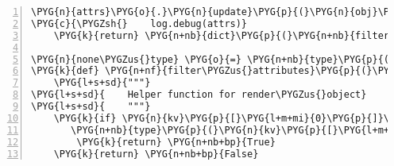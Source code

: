 \begin{Verbatim}[commandchars=\\\{\},numbers=left,firstnumber=1,stepnumber=5]
    \PYG{n}{attrs}\PYG{o}{.}\PYG{n}{update}\PYG{p}{(}\PYG{n}{obj}\PYG{o}{.}\PYG{n}{\PYGZus{}\PYGZus{}dict\PYGZus{}\PYGZus{}}\PYG{p}{)}
\PYG{c}{\PYGZsh{}    log.debug(attrs)}
    \PYG{k}{return} \PYG{n+nb}{dict}\PYG{p}{(}\PYG{n+nb}{filter}\PYG{p}{(}\PYG{n}{filter\PYGZus{}attributes}\PYG{p}{,} \PYG{n}{attrs}\PYG{o}{.}\PYG{n}{iteritems}\PYG{p}{(}\PYG{p}{)}\PYG{p}{)}\PYG{p}{)}

\PYG{n}{none\PYGZus{}type} \PYG{o}{=} \PYG{n+nb}{type}\PYG{p}{(}\PYG{n+nb+bp}{None}\PYG{p}{)}
\PYG{k}{def} \PYG{n+nf}{filter\PYGZus{}attributes}\PYG{p}{(}\PYG{n}{kv}\PYG{p}{)}\PYG{p}{:}
    \PYG{l+s+sd}{"""}
\PYG{l+s+sd}{    Helper function for render\PYGZus{}object}
\PYG{l+s+sd}{    """}
    \PYG{k}{if} \PYG{n}{kv}\PYG{p}{[}\PYG{l+m+mi}{0}\PYG{p}{]}\PYG{p}{[}\PYG{l+m+mi}{0}\PYG{p}{]} \PYG{o}{!=} \PYG{l+s}{'}\PYG{l+s}{\PYGZus{}}\PYG{l+s}{'} \PYG{o+ow}{and} \PYGZbs{}
       \PYG{n+nb}{type}\PYG{p}{(}\PYG{n}{kv}\PYG{p}{[}\PYG{l+m+mi}{1}\PYG{p}{]}\PYG{p}{)} \PYG{o+ow}{in} \PYG{p}{(}\PYG{n}{none\PYGZus{}type}\PYG{p}{,} \PYG{n+nb}{bool}\PYG{p}{,} \PYG{n+nb}{int}\PYG{p}{,} \PYG{n+nb}{long}\PYG{p}{,} \PYG{n+nb}{float}\PYG{p}{,} \PYG{n+nb}{str}\PYG{p}{,} \PYG{n+nb}{unicode}\PYG{p}{,} \PYG{n+nb}{list}\PYG{p}{)}\PYG{p}{:}
        \PYG{k}{return} \PYG{n+nb+bp}{True}
    \PYG{k}{return} \PYG{n+nb+bp}{False}
\end{Verbatim}


